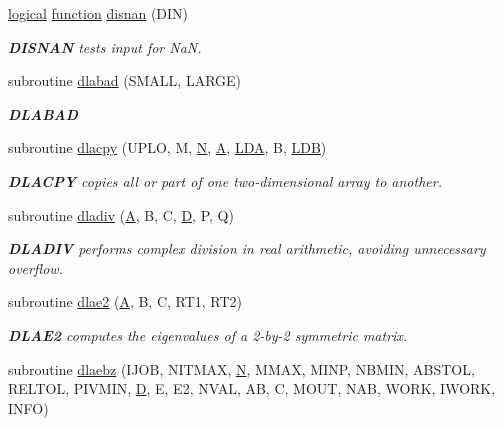 \begin{DoxyCompactItemize}
\hyperlink{tnc_8c_aa7b64cdf39500931f7b333343791a104}{logical} \hyperlink{afunc_8m_a7b5e596df91eadea6c537c0825e894a7}{function} \hyperlink{group__auxOTHERauxiliary_ga230d4e1886896853b11e44e541b2c6a3}{disnan} (D\+I\+N)
\begin{DoxyCompactList}\small\item\em {\bfseries D\+I\+S\+N\+A\+N} tests input for Na\+N. \end{DoxyCompactList}\item 
subroutine \hyperlink{group__auxOTHERauxiliary_ga57ac7409aedb2a380d5d0e625ffbeb7a}{dlabad} (S\+M\+A\+L\+L, L\+A\+R\+G\+E)
\begin{DoxyCompactList}\small\item\em {\bfseries D\+L\+A\+B\+A\+D} \end{DoxyCompactList}\item 
subroutine \hyperlink{group__auxOTHERauxiliary_ga7eb8731ffab2734378157c40964bf788}{dlacpy} (U\+P\+L\+O, M, \hyperlink{polmisc_8c_a0240ac851181b84ac374872dc5434ee4}{N}, \hyperlink{classA}{A}, \hyperlink{example__user_8c_ae946da542ce0db94dced19b2ecefd1aa}{L\+D\+A}, B, \hyperlink{example__user_8c_a50e90a7104df172b5a89a06c47fcca04}{L\+D\+B})
\begin{DoxyCompactList}\small\item\em {\bfseries D\+L\+A\+C\+P\+Y} copies all or part of one two-\/dimensional array to another. \end{DoxyCompactList}\item 
subroutine \hyperlink{group__auxOTHERauxiliary_gad1c0279ec29e8ac222f1e319f4144fcb}{dladiv} (\hyperlink{classA}{A}, B, C, \hyperlink{odrpack_8h_a7dae6ea403d00f3687f24a874e67d139}{D}, P, Q)
\begin{DoxyCompactList}\small\item\em {\bfseries D\+L\+A\+D\+I\+V} performs complex division in real arithmetic, avoiding unnecessary overflow. \end{DoxyCompactList}\item 
subroutine \hyperlink{group__auxOTHERauxiliary_ga8a36d905c1c66d345f791b91254da0ae}{dlae2} (\hyperlink{classA}{A}, B, C, R\+T1, R\+T2)
\begin{DoxyCompactList}\small\item\em {\bfseries D\+L\+A\+E2} computes the eigenvalues of a 2-\/by-\/2 symmetric matrix. \end{DoxyCompactList}\item 
subroutine \hyperlink{group__auxOTHERauxiliary_ga79da86f5a84d0038788717338eef245d}{dlaebz} (I\+J\+O\+B, N\+I\+T\+M\+A\+X, \hyperlink{polmisc_8c_a0240ac851181b84ac374872dc5434ee4}{N}, M\+M\+A\+X, M\+I\+N\+P, N\+B\+M\+I\+N, A\+B\+S\+T\+O\+L, R\+E\+L\+T\+O\+L, P\+I\+V\+M\+I\+N, \hyperlink{odrpack_8h_a7dae6ea403d00f3687f24a874e67d139}{D}, E, E2, N\+V\+A\+L, A\+B, C, M\+O\+U\+T, N\+A\+B, W\+O\+R\+K, I\+W\+O\+R\+K, I\+N\+F\+O)

\end{DoxyCompactItemize}
